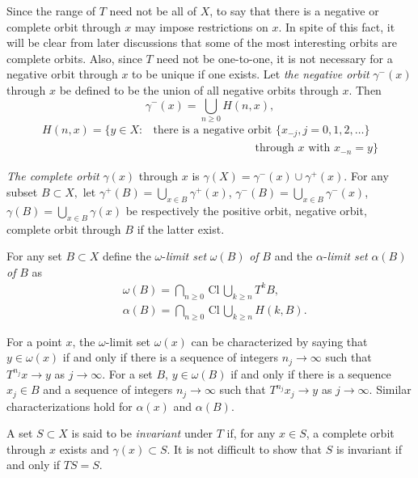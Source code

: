 \documentclass{surv-l}
\theoremstyle{plain}
\theoremstyle{definition}
\numberwithin{equation}{section}
\numberwithin{figure}{chapter}
\begin{document}
Since the range of $T$ need not be all of $X$, to say that there is a negative or complete orbit through $x$ may impose restrictions on $x$. In spite of this fact, it will be clear from later discussions that some of the most interesting orbits are complete orbits. Also, since $T$ need not be one-to-one, it is not necessary for a negative orbit through $x$ to be unique if one exists. Let \emph{the negative orbit} $\gamma^{-}(x)$ through $x$ be defined to be the union of all negative orbits through $x$. Then
\begin{equation*}
\gamma^{-}(x)=\bigcup_{n\geq 0}H(n, x),
\end{equation*}
\begin{align*}
H(n, x)=\{y\in X: &\text{there is a negative orbit } \{x_{-j},j=0,1,2,\ldots \}\\
&\qquad \qquad \qquad \qquad \quad\text{through $x$ with } x_{-n}=y\}
\end{align*}

\emph{The complete orbit} $\gamma(x)$ through $x$ is $\gamma(X)=\gamma^{-}(x)\cup\gamma^{+}(x)$. For any subset $B\subset X,$ let $\gamma^{+}(B)=\bigcup_{x\in B}\gamma^{+}(x)$,
$\gamma^{-}(B)=\bigcup_{x\in B}\gamma^{-}(x)$, $\gamma(B)=\bigcup_{x\in B}\gamma(x)$ be respectively the positive orbit, negative orbit, complete orbit through $B$ if the latter exist.

For any set $B\subset X$ define the $\omega$-\emph{limit set} $\omega(B)$ \emph{of} $B$ and the $\alpha$-\emph{limit set} $\alpha(B)$ \emph{of} $B$ as
\begin{align*}
&\omega(B)=\bigcap_{n\geq 0}\, \mathrm{Cl}\, \bigcup_{k\geq n}T^{k}B,\\
&\alpha(B)=\bigcap_{n\geq 0}\, \mathrm{Cl}\, \bigcup_{k\geq n}H(k, B).
\end{align*}

For a point $x$, the $\omega$-limit set $\omega(x)$ can be characterized by saying that $y\in\omega(x)$ if and only if there is a sequence of integers $ n_{j}\rightarrow\infty$ such that $T^{n_{j}}x\rightarrow y$ as $j \rightarrow \infty$. For a set $B,\, y \in \omega(B)$ if and only if there is a sequence $x_{j} \in B$ and a sequence of integers $n_{j}\rightarrow\infty$ such that $T^{n_{j}}x_{j}\rightarrow y$ as $ j\rightarrow\infty$. Similar characterizations hold for $\alpha(x)$ and $\alpha(B)$.

A set $S\subset X$ is said to be \emph{invariant} under $T$ if, for any $x\in S$, a complete orbit through $x$ exists and $\gamma(x)\subset S$. It is not difficult to show that $S$ is invariant if and only if $TS={S}$.
\end{document}
